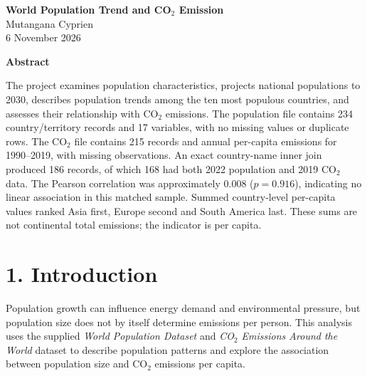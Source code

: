 \documentclass[10pt,a4paper]{article}
\begin{document}
\begin{center}
{\Large\bfseries World Population Trend and CO$_2$ Emission}\\[14pt]
{\large Mutangana Cyprien}\\[8pt]
{\normalsize 6 November 2026}
\end{center}

\vspace{22pt}

\begin{center}
{\large\bfseries Abstract}
\end{center}
\vspace{6pt}
\begin{center}
\begin{minipage}{\textwidth}
\small\setlength{\parindent}{0pt}\setlength{\parskip}{0pt}
\raggedright
The project examines population characteristics, projects national populations to 2030, describes population trends among the ten most populous countries, and assesses their relationship with CO$_2$ emissions. The population file contains 234 country/territory records and 17 variables, with no missing values or duplicate rows. The CO$_2$ file contains 215 records and annual per-capita emissions for 1990--2019, with missing observations. An exact country-name inner join produced 186 records, of which 168 had both 2022 population and 2019 CO$_2$ data. The Pearson correlation was approximately 0.008 ($p=0.916$), indicating no linear association in this matched sample. Summed country-level per-capita values ranked Asia first, Europe second and South America last. These sums are not continental total emissions; the indicator is per capita.
\end{minipage}
\end{center}

\vspace{12pt}

\section*{1. Introduction}
Population growth can influence energy demand and environmental pressure, but population size does not by itself determine emissions per person. This analysis uses the supplied \emph{World Population Dataset} and \emph{CO$_2$ Emissions Around the World} dataset to describe population patterns and explore the association between population size and CO$_2$ emissions per capita.
\end{document}
